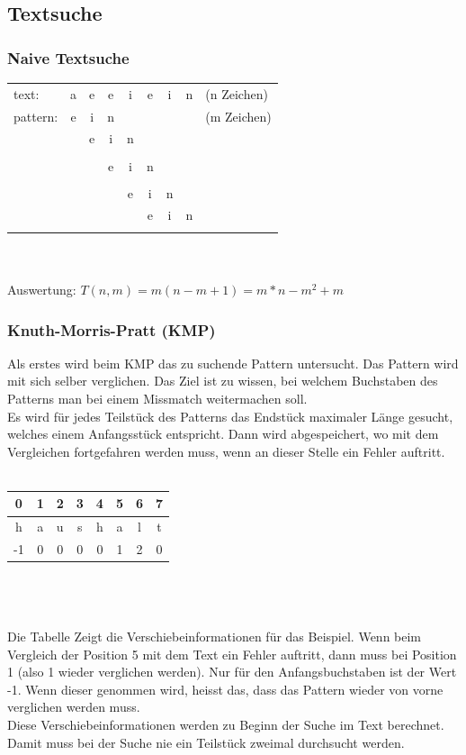 \documentclass[a4paper,10pt]{article}
\begin{document}
\subsection{Textsuche}
\subsubsection{Naive Textsuche}
\begin{tabular}{l c c c c c c c l}
	text: & a & e & e & i & e & i & n & (n Zeichen) \\
	pattern: & e & i & n & & & & & (m Zeichen) \\
	& \lightning & e & i & n \\
	& & \checkmark & \lightning \\
	& & & e & i & n \\
	& & & \checkmark & \checkmark & \lightning \\
	& & & & e & i & n \\
	& & & & \lightning & e & i & n \\
	& & & & & \checkmark & \checkmark & \checkmark \\
\end{tabular} \\ \\
Auswertung: $T(n,m) = m(n-m+1)=m*n-m^2+m$

\subsubsection{Knuth-Morris-Pratt (KMP)}
Als erstes wird beim KMP das zu suchende Pattern untersucht. Das Pattern wird mit sich selber verglichen. Das Ziel ist zu wissen, bei welchem Buchstaben des Patterns man bei einem Missmatch weitermachen soll. \\
Es wird f\"ur jedes Teilst\"uck des Patterns das Endst\"uck maximaler L\"ange gesucht, welches einem Anfangsst\"uck entspricht. Dann wird abgespeichert, wo mit dem Vergleichen fortgefahren werden muss, wenn an dieser Stelle ein Fehler auftritt. \\ \\
\begin{tabular}{|c|c|c|c|c|c|c|c|}
	\hline 
	0 & 1 & 2 & 3 & 4 & 5 & 6 & 7 \\
	\hline
	h & a & u & s & h & a & l & t \\
	\hline
	-1 & 0 & 0 & 0 & 0 & 1 & 2 & 0 \\
	\hline
\end{tabular} \\ \\ \\
Die Tabelle Zeigt die Verschiebeinformationen f\"ur das Beispiel. Wenn beim Vergleich der Position 5 mit dem Text ein Fehler auftritt, dann muss bei Position 1 (also 1 wieder verglichen werden). Nur f\"ur den Anfangsbuchstaben ist der Wert -1. Wenn dieser genommen wird, heisst das, dass das Pattern wieder von vorne verglichen werden muss. \\
Diese Verschiebeinformationen werden zu Beginn der Suche im Text berechnet. Damit muss bei der Suche nie ein Teilst\"uck zweimal durchsucht werden. \\
\end{document}
